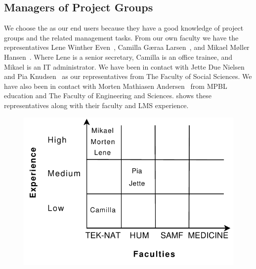 
\subsection{Managers of Project Groups}
\label{sub:enduserstool}
We choose the \admpers{} as our end users because they have a good knowledge of project groups and the related management tasks.
From our own faculty we have the representatives Lene Winther Even~\cite{lene}, Camilla G\ae{}raa Larsen~\cite{camilla}, and Mikael M\o{}ller Hansen~\cite{mikael}.
Where Lene is a senior secretary, Camilla is an office trainee, and Mikael is an IT administrator.
We have been in contact with  Jette Due Nielsen~\cite{jette} and Pia Knudsen~\cite{piak} as our representatives from The Faculty of Social Sciences.
We have also been in contact with Morten Mathiasen Andersen~\cite{morten} from MPBL education and The Faculty of Engineering and Sciences.
 shows these representatives along with their faculty and LMS experience.

\begin{figure}%
\center
\includegraphics[scale=0.50]{images/administratorsOfPG}%
%
\label{fig:adminPG}%
\end{figure}
